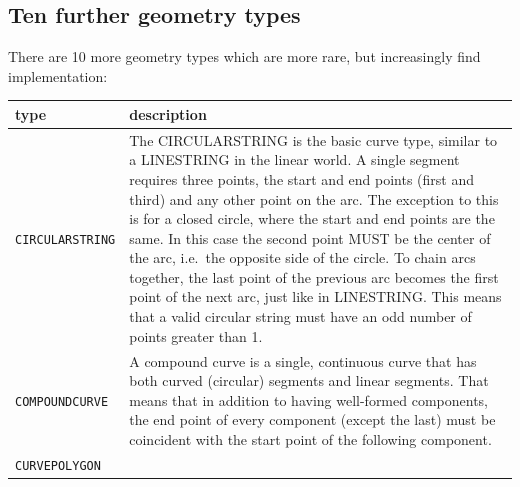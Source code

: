 \documentclass[]{book}
\begin{document}
\hypertarget{ten-further-geometry-types}{%
\subsection{Ten further geometry types}\label{ten-further-geometry-types}}

There are 10 more geometry types which are more rare, but increasingly find implementation:

\begin{longtable}[]{@{}ll@{}}
\toprule
\begin{minipage}[b]{0.26\columnwidth}\raggedright
type\strut
\end{minipage} & \begin{minipage}[b]{0.68\columnwidth}\raggedright
description\strut
\end{minipage}\tabularnewline
\midrule
\endhead
\begin{minipage}[t]{0.26\columnwidth}\raggedright
\texttt{CIRCULARSTRING}\strut
\end{minipage} & \begin{minipage}[t]{0.68\columnwidth}\raggedright
The CIRCULARSTRING is the basic curve type, similar to a LINESTRING in the linear world. A single segment requires three points, the start and end points (first and third) and any other point on the arc. The exception to this is for a closed circle, where the start and end points are the same. In this case the second point MUST be the center of the arc, i.e.~the opposite side of the circle. To chain arcs together, the last point of the previous arc becomes the first point of the next arc, just like in LINESTRING. This means that a valid circular string must have an odd number of points greater than 1.\strut
\end{minipage}\tabularnewline
\begin{minipage}[t]{0.26\columnwidth}\raggedright
\texttt{COMPOUNDCURVE}\strut
\end{minipage} & \begin{minipage}[t]{0.68\columnwidth}\raggedright
A compound curve is a single, continuous curve that has both curved (circular) segments and linear segments. That means that in addition to having well-formed components, the end point of every component (except the last) must be coincident with the start point of the following component.\strut
\end{minipage}\tabularnewline
\begin{minipage}[t]{0.26\columnwidth}\raggedright
\texttt{CURVEPOLYGON}\strut
\end{minipage} & \begin{minipage}[t]{0.68\columnwidth}\raggedright

\end{minipage}
\end{longtable}
\end{document}
